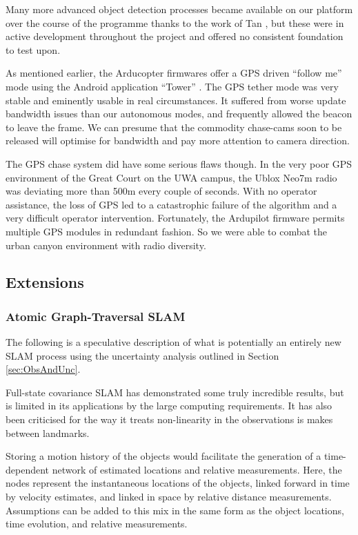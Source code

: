 \documentclass{article}
\newcounter{subsubsubsection}[subsubsection]
\begin{document}
        Many more advanced object detection processes became available on our platform over the course of the programme thanks to the work of Tan \cite{Tan}, but these were in active development throughout the project and offered no consistent foundation to test upon.

        As mentioned earlier, the Arducopter firmwares offer a GPS driven ``follow me'' mode using the Android application ``Tower'' \cite{3dr-tower}.
        The GPS tether mode was very stable and eminently usable in real circumstances.  It suffered from worse update bandwidth issues than our autonomous modes, and frequently allowed the beacon to leave the frame.  We can presume that the commodity chase-cams soon to be released will optimise for bandwidth and pay more attention to camera direction.

        The GPS chase system did have some serious flaws though.  In the very poor GPS environment of the Great Court on the UWA campus, the Ublox Neo7m radio was deviating more than 500m every couple of seconds.  With no operator assistance, the loss of GPS led to a catastrophic failure of the algorithm and a very difficult operator intervention.  Fortunately, the Ardupilot firmware permits multiple GPS modules in redundant fashion.  So we were able to combat the urban canyon environment with radio diversity.

    \subsection{Extensions}

      \subsubsection{Atomic Graph-Traversal SLAM}

      \label{sec:SLAMproposal}
        The following is a speculative description of what is potentially an entirely new SLAM process using the uncertainty analysis outlined in Section \ref{sec:ObsAndUnc}.

        Full-state covariance SLAM has demonstrated some truly incredible results, but is limited in its applications by the large computing requirements.  It has also been criticised for the way it treats non-linearity in the observations is makes between landmarks.


        Storing a motion history of the objects would facilitate the generation of a time-dependent network of estimated locations and relative measurements.
        Here, the nodes represent the instantaneous locations of the objects, linked forward in time by velocity estimates, and linked in space by relative distance measurements.  Assumptions can be added to this mix in the same form as the object locations, time evolution, and relative measurements.
\end{document}
